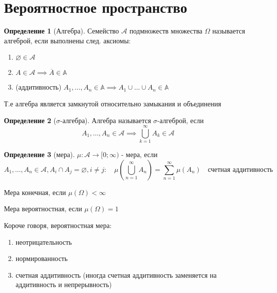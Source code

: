 \documentclass[a4paper]{article}
\theoremstyle{definition}
\newtheorem*{definition}{Определение}
\theoremstyle{remark}
\begin{document}
\tableofcontents
\section{Вероятностное пространство}

\begin{definition}[Алгебра]
    Семейство $\mathcal{A}$ подмножеств множества $\Omega$ называется
    алгеброй, если выполнены след. аксиомы:
    \begin{enumerate}
        \item $\varnothing \in \mathcal{A}$
        \item $A\in\mathcal{A} \implies \overline{A}\in \mathbb{A}$
        \item (аддитивность) $A_1, \dots, A_n \in \mathbb{A} \implies A_1 \cup \dots \cup A_n\in \mathbb{A}$ 
    \end{enumerate}
\end{definition}
Т.е алгебра является замкнутой относительно замыкания и объединения
\begin{definition}[$\sigma$-алгебра]
    Алгебра называется $\sigma$-алгеброй, если 
    \[A_1, \dots, A_n \in \mathcal{A} \implies \bigcup\limits_{k = 1}^\infty  A_k \in \mathcal{A}\]
\end{definition}
\begin{definition}[мера]
    $\mu: \mathcal {A} \to [0; \infty)$ - мера, если 
    \[A_1, \dots , A_n \in \mathcal{A}, A_i\cap A_j = \varnothing, i\neq j: \quad \mu(\bigcup\limits_{n = 1}^\infty  A_n) = \sum\limits_{n = 1}^\infty \mu (A_n)\quad \text{счетная аддитивность}\]

    Мера конечная, если $\mu(\Omega) < \infty$

    Мера вероятностная, если $\mu (\Omega) = 1$
\end{definition}
Короче говоря, вероятностная мера:
\begin{enumerate}
    \item неотрицательность 
    \item нормированность 
    \item счетная аддитивность (иногда счетная аддитивность заменяется на аддитивность и непрерывность)
\end{enumerate}
\end{document}
